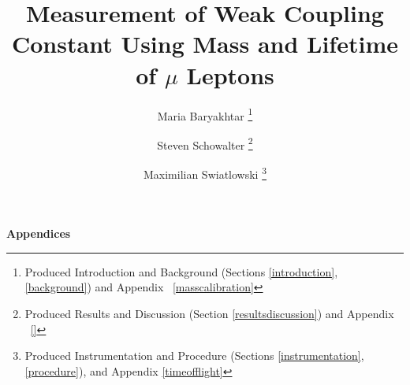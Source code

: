 \documentclass[psfig,12pt,notitlepage]{article}
\begin{document}
\title{Measurement of Weak Coupling Constant Using Mass and Lifetime
of $\mu$ Leptons} \author{Maria Baryakhtar \footnote{Produced
Introduction and Background (Sections \ref{introduction},
\ref{background}) and Appendix ~\ref{masscalibration}} \and Steven
Schowalter \footnote{Produced Results and Discussion (Section
\ref{resultsdiscussion}) and Appendix ~\ref{}} \and Maximilian Swiatlowski
\footnote{Produced Instrumentation and Procedure (Sections
\ref{instrumentation}, \ref{procedure}), and Appendix
\ref{timeofflight}}}

\maketitle




\tableofcontents
\setcounter{tocdepth}{2}


\clearpage












\newpage

\appendix

\begin{center}
\begin{Large}
\bfseries{Appendices}
\end{Large}
\end{center}






\end{document}
